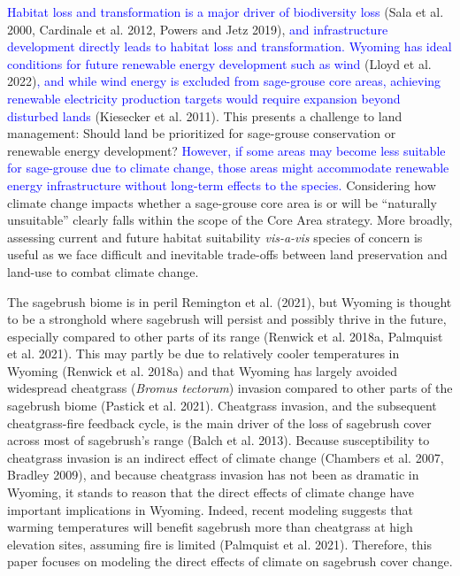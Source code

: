 \documentclass[
  12pt,
]{article}
\begin{document}
\textcolor{blue}{Habitat loss and transformation is a major driver of biodiversity loss} (Sala et al. 2000, Cardinale et al. 2012, Powers and Jetz 2019), \textcolor{blue}{and infrastructure development directly leads to habitat loss and transformation.}
\textcolor{blue}{Wyoming has ideal conditions for future renewable energy development such as wind} (Lloyd et al. 2022)\textcolor{blue}{, and while wind energy is excluded from sage-grouse core areas, achieving renewable electricity production targets would require expansion beyond disturbed lands} (Kiesecker et al. 2011).
This presents a challenge to land management: Should land be prioritized for sage-grouse conservation or renewable energy development?
\textcolor{blue}{However, if some areas may become less suitable for sage-grouse due to climate change, those areas might accommodate renewable energy infrastructure without long-term effects to the species.}
Considering how climate change impacts whether a sage-grouse core area is or will be ``naturally unsuitable'' clearly falls within the scope of the Core Area strategy.
More broadly, assessing current and future habitat suitability \emph{vis-a-vis} species of concern is useful as we face difficult and inevitable trade-offs between land preservation and land-use to combat climate change.

The sagebrush biome is in peril Remington et al. (2021),
but Wyoming is thought to be a stronghold where sagebrush will persist and possibly thrive in the future, especially compared to other parts of its range (Renwick et al. 2018a, Palmquist et al. 2021).
This may partly be due to relatively cooler temperatures in Wyoming (Renwick et al. 2018a) and that Wyoming has largely avoided widespread cheatgrass (\emph{Bromus tectorum}) invasion compared to other parts of the sagebrush biome (Pastick et al. 2021).
Cheatgrass invasion, and the subsequent cheatgrass-fire feedback cycle, is the main driver of the loss of sagebrush cover across most of sagebrush's range (Balch et al. 2013).
Because susceptibility to cheatgrass invasion is an indirect effect of climate change (Chambers et al. 2007, Bradley 2009), and because cheatgrass invasion has not been as dramatic in Wyoming, it stands to reason that the direct effects of climate change have important implications in Wyoming.
Indeed, recent modeling suggests that warming temperatures will benefit sagebrush more than cheatgrass at high elevation sites, assuming fire is limited (Palmquist et al. 2021).
Therefore, this paper focuses on modeling the direct effects of climate on sagebrush cover change.
\end{document}
